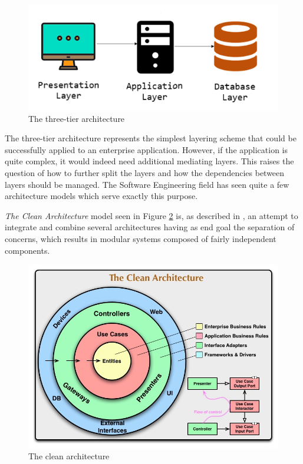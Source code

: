 \begin{figure}[H]
    \centering
    \includegraphics[width=5in]{images/threeTierArchitecture}
    \caption{The three-tier architecture}
    \label{threeTierArchitecture}
\end{figure}

The three-tier architecture represents the simplest layering scheme that could be successfully applied to an enterprise application. However, if the application is quite complex, it would indeed need additional mediating layers. This raises the question of how to further split the layers and how the dependencies between layers should be managed. The Software Engineering field has seen quite a few architecture models which serve exactly this purpose.

\textit{The Clean Architecture} model seen in Figure \ref{cleanArchitectureImg} is, as described in \cite{cleanArchitecture}, an attempt to integrate and combine several architectures having as end goal the separation of concerns, which results in modular systems composed of fairly independent components.

\begin{figure}[H]
    \centering
    \includegraphics[width=6in]{images/cleanArchitecture}
    \caption{The clean architecture \cite{cleanArchitecture}}
    \label{cleanArchitectureImg}
\end{figure}

